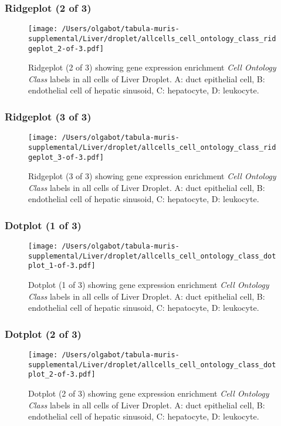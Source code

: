 \clearpage

\subsubsection{Ridgeplot (2 of 3)}
\begin{figure}[h]
\centering
\texttt{[image: /Users/olgabot/tabula-muris-supplemental/Liver/droplet/allcells\_cell\_ontology\_class\_ridgeplot\_2-of-3.pdf]}

\caption{ Ridgeplot (2 of 3)  showing gene expression enrichment \emph{Cell Ontology Class} labels in all cells of Liver Droplet. A: duct epithelial cell, B: endothelial cell of hepatic sinusoid, C: hepatocyte, D: leukocyte.}
\end{figure}


\clearpage

\subsubsection{Ridgeplot (3 of 3)}
\begin{figure}[h]
\centering
\texttt{[image: /Users/olgabot/tabula-muris-supplemental/Liver/droplet/allcells\_cell\_ontology\_class\_ridgeplot\_3-of-3.pdf]}

\caption{ Ridgeplot (3 of 3)  showing gene expression enrichment \emph{Cell Ontology Class} labels in all cells of Liver Droplet. A: duct epithelial cell, B: endothelial cell of hepatic sinusoid, C: hepatocyte, D: leukocyte.}
\end{figure}


\clearpage

\subsubsection{Dotplot (1 of 3)}
\begin{figure}[h]
\centering
\texttt{[image: /Users/olgabot/tabula-muris-supplemental/Liver/droplet/allcells\_cell\_ontology\_class\_dotplot\_1-of-3.pdf]}

\caption{ Dotplot (1 of 3)  showing gene expression enrichment \emph{Cell Ontology Class} labels in all cells of Liver Droplet. A: duct epithelial cell, B: endothelial cell of hepatic sinusoid, C: hepatocyte, D: leukocyte.}
\end{figure}


\clearpage

\subsubsection{Dotplot (2 of 3)}
\begin{figure}[h]
\centering
\texttt{[image: /Users/olgabot/tabula-muris-supplemental/Liver/droplet/allcells\_cell\_ontology\_class\_dotplot\_2-of-3.pdf]}

\caption{ Dotplot (2 of 3)  showing gene expression enrichment \emph{Cell Ontology Class} labels in all cells of Liver Droplet. A: duct epithelial cell, B: endothelial cell of hepatic sinusoid, C: hepatocyte, D: leukocyte.}
\end{figure}



